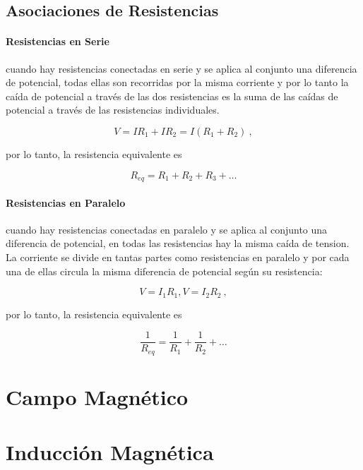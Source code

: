 \documentclass{tufte-handout}
\begin{document}
\subsection{Asociaciones de Resistencias}

\paragraph{Resistencias en Serie} cuando hay resistencias conectadas en serie y se aplica al conjunto una diferencia de potencial, todas ellas son recorridas por la misma corriente y por lo tanto la caída de potencial a través de las dos resistencias es la suma de las caídas de potencial a través de las resistencias individuales.

\begin{equation}
V = IR_1 + IR_2 = I(R_1 + R_2)~,
\end{equation}

por lo tanto, la resistencia equivalente es

\begin{equation}
R_{eq} = R_1 + R_2 + R_3 + \dots
\end{equation}

\paragraph{Resistencias en Paralelo} cuando hay resistencias conectadas en paralelo y se aplica al conjunto una diferencia de potencial, en todas las resistencias hay la misma caída de tension. La corriente se divide en tantas partes como resistencias en paralelo y por cada una de ellas circula la misma diferencia de potencial según su resistencia:

\begin{equation}
V = I_1R_1, V = I_2R_2~,
\end{equation}

por lo tanto, la resistencia equivalente es

\begin{equation}
\frac{1}{R_{eq}} = \frac{1}{R_1} + \frac{1}{R_2} + \dots
\end{equation}

\clearpage

\section{Campo Magnético}

\clearpage

\section{Inducción Magnética}
\end{document}
